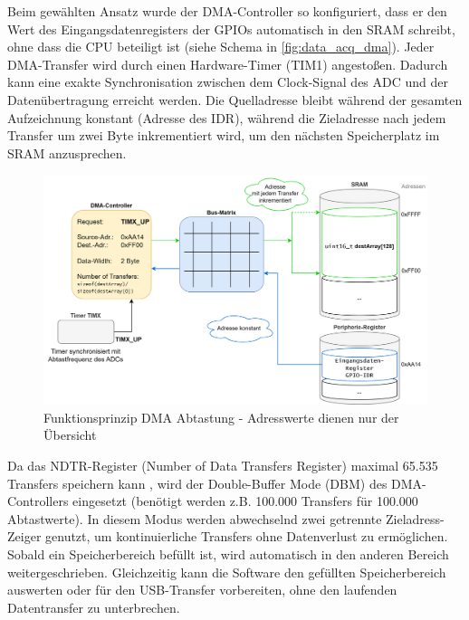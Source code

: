 \documentclass[a4paper, portrait, 12pt]{scrartcl} %
\begin{document}
Beim gewählten Ansatz wurde der DMA-Controller so konfiguriert, dass er den Wert des Eingangsdatenregisters der GPIOs automatisch in den SRAM schreibt, ohne dass die CPU beteiligt ist (siehe Schema in \autoref{fig:data_acq_dma}). Jeder DMA-Transfer wird durch einen Hardware-Timer (TIM1) angestoßen. Dadurch kann eine exakte Synchronisation zwischen dem Clock-Signal des ADC und der Datenübertragung erreicht werden. Die Quelladresse bleibt während der gesamten Aufzeichnung konstant (Adresse des IDR), während die Zieladresse nach jedem Transfer um zwei Byte inkrementiert wird, um den nächsten Speicherplatz im SRAM anzusprechen.

\begin{figure}[H]
	\centering
    \includegraphics[scale=0.1]{Prinzip_DMA_Datenerfassung.png} 
	\caption{Funktionsprinzip DMA Abtastung - Adresswerte dienen nur der Übersicht}
	\label{fig:data_acq_dma}
\end{figure}

Da das NDTR-Register (Number of Data Transfers Register) maximal 65.535 Transfers speichern kann \cite[S. 276]{STmicroelectronics2024}, wird der Double-Buffer Mode (DBM) des DMA-Controllers eingesetzt (benötigt werden z.B. 100.000 Transfers für 100.000 Abtastwerte). In diesem Modus werden abwechselnd zwei getrennte Zieladress-Zeiger genutzt, um kontinuierliche Transfers ohne Datenverlust zu ermöglichen. Sobald ein Speicherbereich befüllt ist, wird automatisch in den anderen Bereich weitergeschrieben. Gleichzeitig kann die Software den gefüllten Speicherbereich auswerten oder für den USB-Transfer vorbereiten, ohne den laufenden Datentransfer zu unterbrechen.\\
\end{document}
